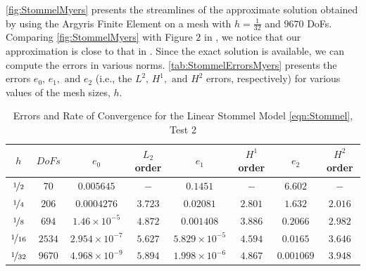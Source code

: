 \autoref{fig:StommelMyers} presents the streamlines of the approximate solution obtained by using the Argyris Finite
Element on a mesh with $h=\frac{1}{32}$ and $9670$ DoFs. Comparing \autoref{fig:StommelMyers} with Figure $2$ in
\cite{Myers}, we notice that our approximation is close to that in \cite{Myers}. Since the exact
solution is available, we can compute the errors in various norms. \autoref{tab:StommelErrorsMyers}
presents the errors $e_0,\, e_1, \text{ and } e_2$ (i.e., the $L^2,\, H^1, \text{ and } H^2$ errors,
respectively) for various values of the mesh sizes, $h$.

\begin{table}[H]
\begin{center}
\begin{tabular}{|c|c|c|c|c|c|c|c|}%
  \hline
  $h$ & $DoFs$ & $e_0$ & $L_2$ order & $e_1$ & $H^1$ order & $e_2$ & $H^2$ order \\[0.2em] %
  \hline
  $\nicefrac{1}{2}$ & $70$ & $0.005645$ & $-$ & $0.1451$ & $-$ & $6.602$ & $-$ \\[0.2em] %
  $\nicefrac{1}{4}$ & $206$ & $0.0004276$ & $3.723$ & $0.02081$ & $2.801$ & $1.632$ & $2.016$ \\[0.2em] %
  $\nicefrac{1}{8}$ & $694$ & $1.46\times 10^{-5}$ & $4.872$ & $0.001408$ & $3.886$ & $0.2066$ & $2.982$ \\[0.2em] %
  $\nicefrac{1}{16}$ & $2534$ & $2.954\times 10^{-7}$ & $5.627$ & $5.829\times 10^{-5}$ & $4.594$ & $0.0165$ & $3.646$ \\[0.2em] %
  $\nicefrac{1}{32}$ & $9670$ & $4.968\times 10^{-9}$ & $5.894$ & $1.998\times 10^{-6}$ & $4.867$ & $0.001069$ & $3.948$ \\[0.2em] %
  \hline
\end{tabular}
\end{center}
\caption{Errors and Rate of Convergence for the Linear Stommel Model \eqref{eqn:Stommel}, Test 2 \cite{Myers}}
\label{tab:StommelErrorsMyers}
\end{table}


